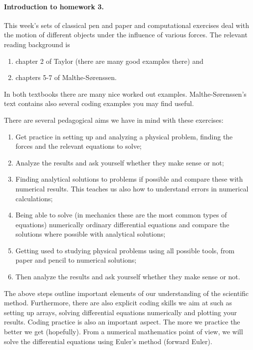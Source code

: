 \documentclass[%
oneside,                 %
final,                   %
10pt]{article}
\begin{document}
\noindent
\paragraph{Introduction to homework 3.}
This week's sets of classical pen and paper and computational
exercises deal with the motion of different objects under the
influence of various forces. The relevant reading background is
\begin{enumerate}
\item chapter 2 of Taylor (there are many good examples there) and

\item chapters 5-7 of Malthe-Sørenssen.
\end{enumerate}

\noindent
In both textbooks there are many nice worked out
examples. Malthe-Sørenssen's text contains also several coding
examples you may find useful.

There are several pedagogical aims we have in mind with these exercises:
\begin{enumerate}
\item Get practice in setting up and analyzing a physical problem, finding the forces and the relevant equations to solve;

\item Analyze the results and ask yourself whether they make sense or not;

\item Finding analytical solutions to problems if possible and compare these with numerical results. This teaches us also how to understand errors in numerical calculations;

\item Being able to solve (in mechanics these are the most common types of equations) numerically ordinary differential equations and compare the solutions where possible with analytical solutions;

\item Getting used to studying physical problems using all possible tools, from paper and pencil to numerical solutions;

\item Then analyze the results and ask yourself whether they make sense or not.
\end{enumerate}

\noindent
The above steps outline important elements of our understanding of the
scientific method. Furthermore, there are also explicit coding skills
we aim at such as setting up arrays, solving differential equations
numerically and plotting your results.  Coding practice is also an
important aspect. The more we practice the better we get (hopefully).
From a numerical mathematics point of view, we will solve the differential
equations using Euler's method (forward Euler).
\end{document}
